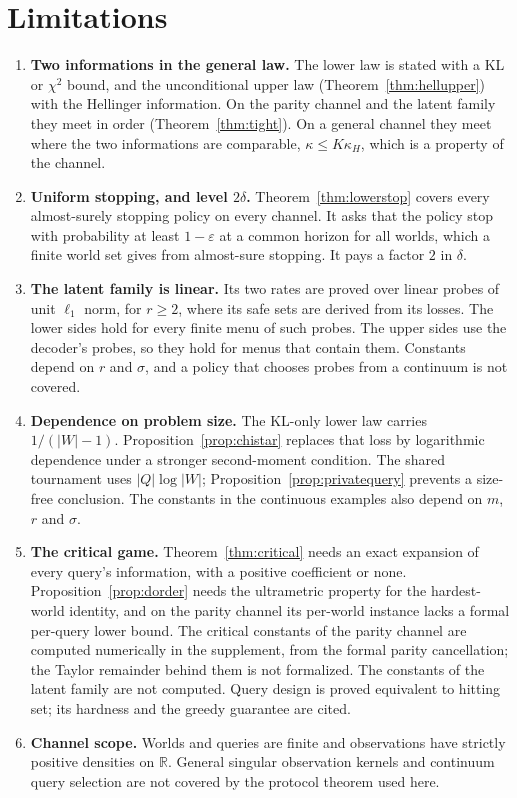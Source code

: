 \section{Limitations}
\label{sec:limits}

\begin{enumerate}
\item[1)] \textbf{Two informations in the general law.} The lower law is stated with a KL or
$\chi^{2}$ bound, and the unconditional upper law (Theorem~\ref{thm:hellupper}) with the
Hellinger information. On the parity channel and the latent family they meet in order
(Theorem~\ref{thm:tight}). On a general channel they meet where the two informations are
comparable, $\kappa\le K\kappa_{H}$, which is a property of the channel.
\item[2)] \textbf{Uniform stopping, and level $2\delta$.} Theorem~\ref{thm:lowerstop} covers
every almost-surely stopping policy on every channel. It asks that the policy stop with
probability at least $1-\varepsilon$ at a common horizon for all worlds, which a finite world set
gives from almost-sure stopping. It pays a factor $2$ in $\delta$.
\item[3)] \textbf{The latent family is linear.} Its two rates are proved over linear probes of
unit $\ell_{1}$ norm, for $r\ge2$, where its safe sets are derived from its losses. The lower
sides hold for every finite menu of such probes. The upper sides use the decoder's probes, so
they hold for menus that contain them. Constants depend on $r$ and $\sigma$, and a policy that
chooses probes from a continuum is not covered.
\item[4)] \textbf{Dependence on problem size.} The KL-only lower law carries
$1/(|W|-1)$. Proposition~\ref{prop:chistar} replaces that loss by logarithmic dependence
under a stronger second-moment condition. The shared tournament uses $|Q|\log|W|$;
Proposition~\ref{prop:privatequery} prevents a size-free conclusion. The constants in the
continuous examples also depend on $m$, $r$ and $\sigma$.
\item[5)] \textbf{The critical game.} Theorem~\ref{thm:critical} needs an exact expansion of every
query's information, with a positive coefficient or none. Proposition~\ref{prop:dorder} needs
the ultrametric property for the hardest-world identity, and on the parity channel its
per-world instance lacks a formal per-query lower bound. The critical constants of the parity
channel are computed numerically in the supplement, from the formal parity cancellation; the
Taylor remainder behind them is not formalized. The constants of the latent family are not
computed. Query design is proved equivalent to hitting set; its hardness and the greedy
guarantee are cited.
\item[6)] \textbf{Channel scope.} Worlds and queries are finite and observations have strictly
positive densities on $\mathbb R$. General singular observation kernels and continuum query
selection are not covered by the protocol theorem used here.
\end{enumerate}

